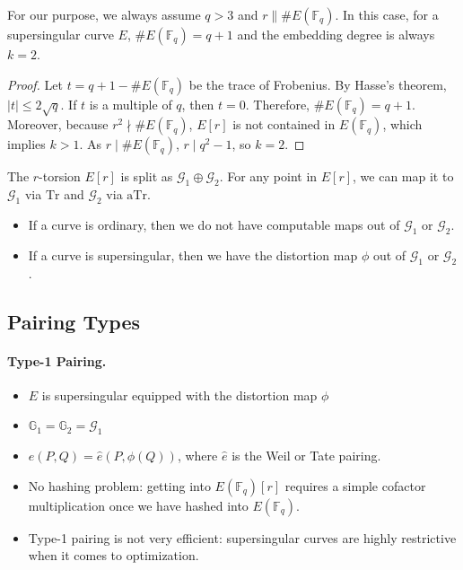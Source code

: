 \begin{proposition}
For our purpose, we always assume $q > 3$ and $r \| \#E(\mathbb{F}_q)$. In this case, for a supersingular curve $E$, $\#E(\mathbb{F}_q) = q+1$ and the embedding degree is always $k=2$.
\end{proposition}

\begin{proof}
	
	Let $t = q + 1 - \#E(\mathbb{F}_q)$ be the trace of Frobenius. By Hasse’s theorem, $|t| \leq 2\sqrt{q}$. If $t$ is a multiple of $q$, then $t = 0$. Therefore, $\#E(\mathbb{F}_q) = q+1$. Moreover, because $r^2 \nmid \#E(\mathbb{F}_q)$, $E[r]$ is not contained in $E(\mathbb{F}_q)$, which implies $k > 1$. As $r \mid \#E(\mathbb{F}_q)$, $r \mid q^2-1$, so $k=2$.

\end{proof}

The $r$-torsion $E[r]$ is split as $\mathcal{G}_1 \oplus \mathcal{G}_2$. For any point in $E[r]$, we can map it to $\mathcal{G}_1$ via $\text{Tr}$ and $\mathcal{G}_2$ via $\text{aTr}$.
\begin{itemize}
	\item If a curve is ordinary, then we do not have computable maps out of $\mathcal{G}_1$ or $\mathcal{G}_2$.

	\item If a curve is supersingular, then we have the distortion map $\phi$ out of $\mathcal{G}_1$ or $\mathcal{G}_2$.
\end{itemize}

\subsection{Pairing Types}

\paragraph{Type-1 Pairing.}

\begin{itemize}
	\item $E$ is supersingular equipped with the distortion map $\phi$
	\item $\mathbb{G}_1 = \mathbb{G}_2 = \mathcal{G}_1$
	\item $e(P, Q) = \hat{e} (P, \phi(Q))$, where $\hat{e}$ is the Weil or Tate pairing.
	\item No hashing problem: getting into $E(\mathbb{F}_q)[r]$ requires a simple cofactor multiplication once we have hashed into $E(\mathbb{F}_q)$.
	\item Type-1 pairing is not very efficient: supersingular curves are highly restrictive when it comes to optimization.
\end{itemize}

